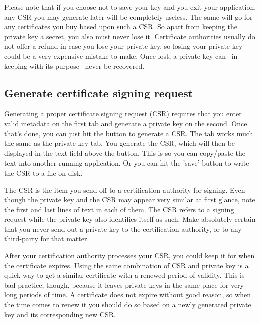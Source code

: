 \documentclass[a4paper,12pt]{article}
\begin{document}
Please note that if you choose not to save your key and you exit your application, any CSR you may generate later will be completely useless. The same will go for any certificates you buy based upon such a CSR. So apart from keeping the private key a secret, you also must never lose it. Certificate authorities usually do not offer a refund in case you lose your private key, so losing your private key could be a very expensive mistake to make. Once lost, a private key can --in keeping with its purpose-- never be recovered.

\subsection{Generate certificate signing request}
Generating a proper certificate signing request (CSR) requires that you enter valid metadata on the first tab and generate a private key on the second. Once that's done, you can just hit the button to generate a CSR. The tab works much the same as the private key tab. You generate the CSR, which will then be displayed in the text field above the button. This is so you can copy/paste the text into another running application. Or you can hit the 'save' button to write the CSR to a file on disk.

The CSR is the item you send off to a certification authority for signing. Even though the private key and the CSR may appear very similar at first glance, note the first and last lines of text in each of them. The CSR refers to a signing request while the private key also identifies itself as such. Make absolutely certain that you never send out a private key to the certification authority, or to any third-party for that matter.

After your certification authority processes your CSR, you could keep it for when the certificate expires. Using the same combination of CSR and private key is a quick way to get a similar certificate with a renewed period of validity. This is bad practice, though, because it leaves private keys in the same place for very long periods of time. A certificate does not expire without good reason, so when the time comes to renew it you should do so based on a newly generated private key and its corresponding new CSR.
\end{document}
